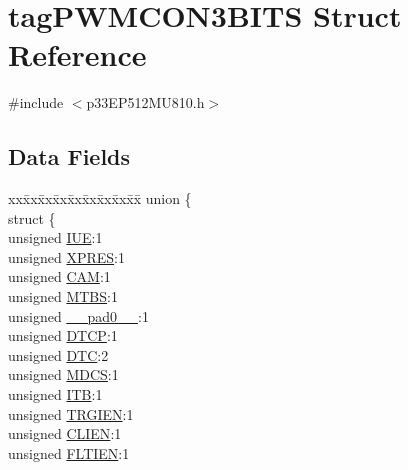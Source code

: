 \hypertarget{structtag_p_w_m_c_o_n3_b_i_t_s}{}\section{tag\+P\+W\+M\+C\+O\+N3\+B\+I\+TS Struct Reference}
\label{structtag_p_w_m_c_o_n3_b_i_t_s}


{\ttfamily \#include $<$p33\+E\+P512\+M\+U810.\+h$>$}

\subsection*{Data Fields}
\begin{DoxyCompactItemize}
\item 
\begin{tabbing}
xx\=xx\=xx\=xx\=xx\=xx\=xx\=xx\=xx\=\kill
union \{\\
\>struct \{\\
\>\>unsigned \hyperlink{structtag_p_w_m_c_o_n3_b_i_t_s_a2b95b61e8c208d0ffdc7441133d3b0a3}{IUE}:1\\
\>\>unsigned \hyperlink{structtag_p_w_m_c_o_n3_b_i_t_s_a6a3f824223966417e0005dbe08b1833c}{XPRES}:1\\
\>\>unsigned \hyperlink{structtag_p_w_m_c_o_n3_b_i_t_s_a912fd2c19cfc2bb7d43e4cb3bae4d0bf}{CAM}:1\\
\>\>unsigned \hyperlink{structtag_p_w_m_c_o_n3_b_i_t_s_ad4b1db357995f4e3ff43d2e6c734159e}{MTBS}:1\\
\>\>unsigned \hyperlink{structtag_p_w_m_c_o_n3_b_i_t_s_adf71f3d8410c1f1dbbc96680a92c49af}{\_\_pad0\_\_}:1\\
\>\>unsigned \hyperlink{structtag_p_w_m_c_o_n3_b_i_t_s_a42fd7808d2a3b328aac343a2c4e781d7}{DTCP}:1\\
\>\>unsigned \hyperlink{structtag_p_w_m_c_o_n3_b_i_t_s_a0ac766a24b648c50040810c3f207926c}{DTC}:2\\
\>\>unsigned \hyperlink{structtag_p_w_m_c_o_n3_b_i_t_s_acb5516c8c2c937478d0e653afdb05254}{MDCS}:1\\
\>\>unsigned \hyperlink{structtag_p_w_m_c_o_n3_b_i_t_s_a5d923b710199bb786b4c9f1d71b104f2}{ITB}:1\\
\>\>unsigned \hyperlink{structtag_p_w_m_c_o_n3_b_i_t_s_a4dd5600256667e48b1fe49e80ef95d33}{TRGIEN}:1\\
\>\>unsigned \hyperlink{structtag_p_w_m_c_o_n3_b_i_t_s_a6536fa9a3ad62ffb7a3ed0a2b1bf6394}{CLIEN}:1\\
\>\>unsigned \hyperlink{structtag_p_w_m_c_o_n3_b_i_t_s_a4d88b1c37d3feefa1055445ffc9a981c}{FLTIEN}:1\\

\end{tabbing}
\end{DoxyCompactItemize}
